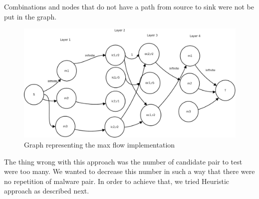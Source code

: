 Combinations and nodes that do not have a path from source to sink were not be put in the graph.\\
\begin{figure}[h]
  \centering
  \includegraphics[scale=0.23]{figures/maxflow.png}
  \caption[Max Flow]{Graph representing the max flow implementation}\label{fig:maxflow}
\end{figure}
The thing wrong with this approach was the number of candidate pair to test were too many.
We wanted to decrease this number in such a way that there were no repetition of malware pair.
In order to achieve that, we tried Heuristic approach as described next.
